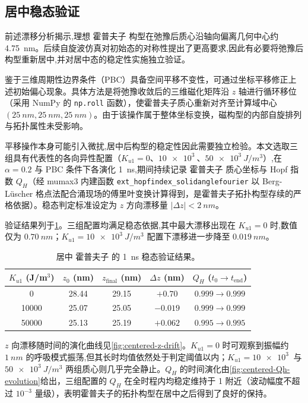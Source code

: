 \subsection{居中稳态验证}
前述漂移分析揭示,理想 霍普夫子 构型在弛豫后质心沿轴向偏离几何中心约 \SI{4.75}{nm}。后续自旋波仿真对初始态的对称性提出了更高要求,因此有必要将弛豫后构型重新居中,并对居中态的稳定性实施独立验证。

鉴于三维周期性边界条件（PBC）具备空间平移不变性，可通过坐标平移修正上述初始偏心现象。具体方法是将弛豫收敛后的三维磁化矩阵沿 $z$ 轴进行循环移位（采用 NumPy 的 \texttt{np.roll} 函数），使霍普夫子质心重新对齐至计算域中心 $(\SI{25}{nm}, \SI{25}{nm}, \SI{25}{nm})$。由于该操作属于整体坐标变换，磁构型的内部自旋排列与拓扑属性未受影响。

平移操作本身可能引入微扰,居中后构型的稳定性因此需要独立检验。本文选取三组具有代表性的各向异性配置（$K_{u1} = 0$、$\SI{10e3}{}$、$\SI{50e3}{J/m^3}$）,在 $\alpha = 0.2$ 与 PBC 条件下各演化 \SI{1}{ns},期间持续记录 霍普夫子 质心坐标与 Hopf 指数 $Q_H$（经 mumax3 内建函数 \texttt{ext\_hopfindex\_solidanglefourier} 以 Berg-Lüscher 格点法配合涌现场的傅里叶变换计算得到，是霍普夫子拓扑构型存续的严格依据）。稳态判定标准设定为 $z$ 方向漂移量 $|\Delta z| < \SI{2}{nm}$。

验证结果列于\cref{tab:centered-stability}。三组配置均满足稳态依据,其中最大漂移出现在 $K_{u1} = 0$ 时,数值仅为 $\SI{0.70}{nm}$；$K_{u1} = \SI{10e3}{J/m^3}$ 配置下漂移进一步降至 $\SI{0.019}{nm}$。

\begin{table}[htbp]
  \centering
  \caption{居中 霍普夫子 的 \SI{1}{ns} 稳态验证结果。}
  \label{tab:centered-stability}
  \begin{tabular}{ccccc}
    \toprule
    $K_{u1}$ (J/m$^3$) & $z_0$ (nm) & $z_{\text{final}}$ (nm) & $\Delta z$ (nm) & $Q_H$ ($t_0 \to t_{\text{end}}$) \\
    \midrule
    0     & 28.44 & 29.15 & $+0.70$ & $0.999 \to 0.999$ \\
    10000 & 25.07 & 25.05 & $-0.019$ & $0.999 \to 0.999$ \\
    50000 & 25.13 & 25.19 & $+0.062$ & $0.995 \to 0.995$ \\
    \bottomrule
  \end{tabular}
\end{table}

$z$ 向漂移随时间的演化曲线见\cref{fig:centered-z-drift}。$K_{u1} = 0$ 时可观察到振幅约 $\SI{1}{nm}$ 的呼吸模式振荡,但其长时均值依然处于判定阈值以内；$K_{u1} = \SI{10e3}{}$ 与 $\SI{50e3}{J/m^3}$ 两组质心则几乎完全静止。$Q_H$ 的时间演化由\cref{fig:centered-Qh-evolution}给出，三组配置的 $Q_H$ 在全时程内均稳定维持于 1 附近（波动幅度不超过 $10^{-3}$ 量级），表明霍普夫子的拓扑构型在居中之后得到了良好的保持。

